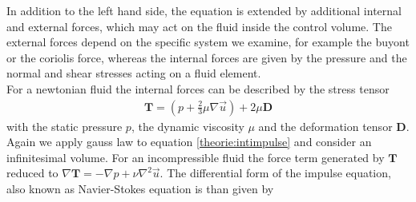 In addition to the left hand side, the equation is extended by additional internal and external forces, which may act on the fluid inside the control volume.
The external forces depend on the specific system  we examine, for example the buyont or the coriolis force, whereas the internal forces
are given by the pressure and the normal and shear stresses acting on a fluid element.\\
For a newtonian fluid the internal forces can be described by the stress tensor
\begin{align}
    \bm{T} =  \left(p + \frac{2}{3}\mu\nabla\vec{u} \right) + 2\mu \bm{D}
\end{align}
with the static pressure $p$, the dynamic viscosity $\mu$ and the deformation tensor $\bm{D}$.
Again we apply gauss law to equation \ref{theorie:intimpulse} and consider an infinitesimal volume.
For an incompressible fluid the force term generated by $\bm{T}$ reduced to $\nabla \bm{T} = -\nabla p  + \nu\nabla^2\vec{u}$.
The differential form of the impulse equation, also known as Navier-Stokes equation is than given by

